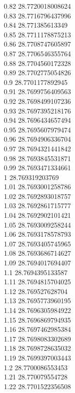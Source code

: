{0.82	28.7720018008624\\
0.83	28.7716796437996\\
0.84	28.771385613349\\
0.85	28.7711178875213\\
0.86	28.7708747605897\\
0.87	28.7706546355764\\
0.88	28.7704560172328\\
0.89	28.7702775054826\\
0.9	28.7701177892945\\
0.91	28.7699756409563\\
0.92	28.7698499107236\\
0.93	28.7697395218176\\
0.94	28.7696434657494\\
0.95	28.7695607979474\\
0.96	28.7694906336704\\
0.97	28.7694321441842\\
0.98	28.7693845531871\\
0.99	28.7693471334661\\
1	28.769319203769\\
1.01	28.7693001258786\\
1.02	28.7692893018757\\
1.03	28.7692861715777\\
1.04	28.7692902101421\\
1.05	28.7693009258244\\
1.06	28.7693178578793\\
1.07	28.7693405745965\\
1.08	28.7693686714627\\
1.09	28.7694017694407\\
1.1	28.7694395133587\\
1.11	28.7694815704025\\
1.12	28.769527628704\\
1.13	28.7695773960195\\
1.14	28.7696305984922\\
1.15	28.7696869794935\\
1.16	28.7697462985384\\
1.17	28.7698083302689\\
1.18	28.7698728635032\\
1.19	28.7699397003443\\
1.2	28.7700086553453\\
1.21	28.770079554728\\
1.22	28.7701522356508\\
}
